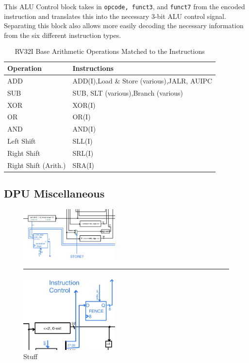 \documentclass[lettersize,journal]{IEEEtran}
\begin{document}
This ALU Control block takes in \verb|opcode, funct3|, and \verb|funct7| from the encoded instruction and translates this into the necessary 3-bit ALU control signal.
Separating this block also allows more easily decoding the necessary information from the six different \cite{riscvunprovisioned} instruction types.
\begin{table}
    \label{table:ALUOps}
    \centering
    \begin{tabular}{|p{2.7cm}|p{4cm}|}
        \hline
        Operation & Instructions \\
        \hline\hline
        ADD & ADD(I),\newline Load \& Store (various),\newline JALR, AUIPC\\
        SUB & SUB, SLT (various),\newline Branch (various)\\
        XOR & XOR(I)\\
        OR & OR(I)\\
        AND & AND(I)\\
        Left Shift & SLL(I)\\
        Right Shift & SRL(I)\\
        Right Shift (Arith.) & SRA(I)\\
        \hline
    \end{tabular}
    \vspace{4pt}
    \caption{RV32I Base Arithmetic Operations Matched to the Instructions}
\end{table}


\subsection{DPU Miscellaneous}
\begin{figure}[!h]
  \label{fig:dpumisc}
  \centering
  \includegraphics[width=5cm]{Misc1.jpg}
  \rule{7cm}{0.8pt}
  \includegraphics[width=5cm]{Misc2.jpg}
  \caption{Stuff}
\end{figure}
\color{red}{TBD}\color{black}
\end{document}
